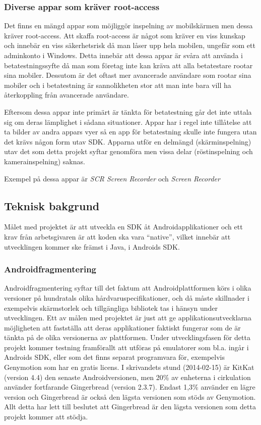 \subsubsection{Diverse appar som kräver root-access}
\label{rootacc}
Det finns en mängd appar som möjliggör inspelning av mobilskärmen men dessa kräver root-access. Att skaffa root-access är något som kräver en viss kunskap och innebär en viss säkerhetsrisk då man låser upp hela mobilen, ungefär som ett adminkonto i Windows. Detta innebär att dessa appar är svåra att använda i betatestningssyfte då man som företag inte kan kräva att alla betatestare rootar sina mobiler. Dessutom är det oftast mer avancerade användare som rootar sina mobiler och i betatestning är sannolikheten stor att man inte bara vill ha återkoppling från avancerade användare. 

Eftersom dessa appar inte primärt är tänkta för betatestning går det inte uttala sig om deras lämplighet i sådana situationer. Appar har i regel inte tillåtelse att ta bilder av andra appars vyer så en app för betatestning skulle inte fungera utan det krävs någon form utav SDK. Apparna utför en delmängd (skärminspelning) utav det som detta projekt syftar genomföra men vissa delar (röstinspelning och kamerainspelning) saknas.

 Exempel på dessa appar är \emph{SCR Screen Recorder} \parencite{scr} och \emph{Screen Recorder} \parencite{sr}

\subsection{Teknisk bakgrund}
\label{sec:tekniskbakgrond}
Målet med projektet är att utveckla en SDK åt Androidapplikationer och ett krav från arbetsgivaren är att koden ska vara ``native'', vilket innebär att utvecklingen kommer ske främst i Java, i Androids SDK. 

\subsubsection{Androidfragmentering}
Androidfragmentering syftar till det faktum att Androidplattformen körs i olika versioner på hundratals olika hårdvaruspecifikationer, och då måste skillnader i exempelvis skärmstorlek och tillgängliga bibliotek tas i hänsyn under utvecklingen. Ett av målen med projektet är just att ge applikationsutvecklarna möjligheten att fastställa att deras applikationer faktiskt fungerar som de är tänkta på de olika versionerna av plattformen. Under utvecklingsfasen för detta projekt kommer testning framförallt att utföras på emulatorer som bl.a. ingår i Androids SDK, eller som det finns separat programvara för, exempelvis Genymotion som har en gratis licens. I skrivandets stund (2014-02-15) är KitKat (version 4.4) den senaste Androidversionen, men 20\% av enheterna i cirkulation använder fortfarande Gingerbread (version 2.3.7).\parencite{androidversions} Endast 1,3\% använder en lägre version och Gingerbread är också den lägsta versionen som stöds av Genymotion. Allt detta har lett till beslutet att Gingerbread är den lägsta versionen som detta projekt kommer att stödja. 

